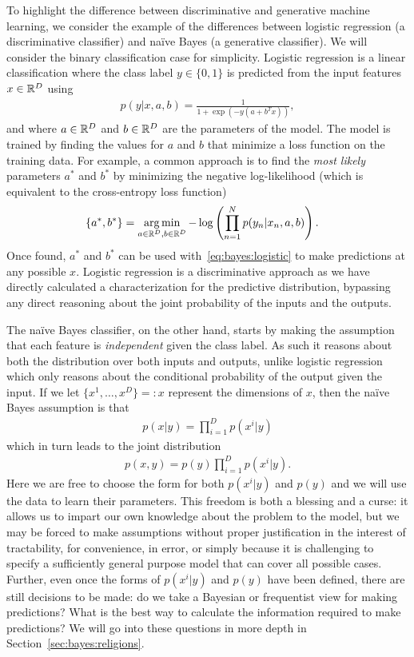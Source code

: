 To highlight the difference between discriminative and generative machine learning, we consider the
example of the differences between logistic regression (a discriminative classifier) and na\"{i}ve Bayes 
(a generative classifier).  We will consider the binary classification case for simplicity.  Logistic regression is a linear
classification where the class label $y \in \{0,1\}$ is predicted from the input features $x \in \mathbb{R}^D$ using
\begin{align}
\label{eq:bayes:logistic}
p(y|x,a,b) = \frac{1}{1+\exp(-y(a+b^Tx))},
\end{align}
and where $a \in \mathbb{R}^D$ and $b \in \mathbb{R}^D$ are the parameters of the model.  The model is trained by finding the values
for $a$ and $b$ that minimize a loss function on the training data.  For example, a common approach
is to find the \emph{most likely} parameters $a^*$ and $b^*$ by minimizing the negative log-likelihood
(which is equivalent to the cross-entropy loss function)
\begin{align}
\{a^*,b^*\} &= \operatorname*{arg\,min}_{a\in \mathbb{R}^D,b\in \mathbb{R}^D} -\log \left(\prod_{n=1}^{N} p(y_n|x_n,a,b)\right).
\end{align}
Once found, $a^*$ and $b^*$ can be used with~\eqref{eq:bayes:logistic} to make predictions at
any possible $x$.  Logistic regression is a discriminative approach as we have directly calculated
a characterization for the predictive distribution, bypassing any direct reasoning about the joint
probability of the inputs and the outputs.

The na\"{i}ve Bayes classifier, on the other hand, starts by making the assumption that each feature
is \emph{independent} given the class label.  As such it reasons about both the distribution over both
inputs and outputs, unlike logistic regression which only reasons about the conditional probability
of the output given the input.   If we let $\{x^1,\dots,x^D\} =: x$ represent the dimensions of $x$, then
the na\"{i}ve Bayes assumption is that
\begin{align}
p(x|y) = \prod_{i=1}^D p(x^i |y)
\end{align}
which in turn leads to the joint distribution
\begin{align}
p(x,y) = p(y) \prod_{i=1}^D p(x^i |y).
\end{align}
Here we are free to choose the form for both $p(x^i |y)$ and $p(y)$ %
and we will use the data to learn their parameters.
This freedom is both a blessing and a curse: it allows us to impart our own knowledge about the problem to
the model, but we may be forced to make assumptions without proper justification in the interest
of tractability, for convenience, in error, or simply because it is challenging to specify a sufficiently
general purpose model that can cover all possible cases.
Further, even once the forms of $p(x^i |y)$ and $p(y)$ have been defined, there are still decisions to be
made: do we take a Bayesian or frequentist view for making predictions? What is the best way
to calculate the information required to make predictions?  We will go into these questions in
more depth in Section~\ref{sec:bayes:religions}.

